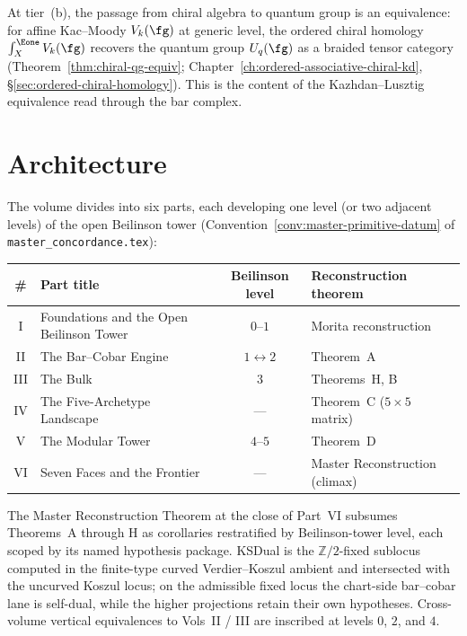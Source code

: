 At tier~(b), the passage from chiral algebra to quantum group
is an equivalence: for affine Kac--Moody $V_k(\fg)$ at generic
level, the ordered chiral homology $\int_X^{\Eone} V_k(\fg)$
recovers the quantum group $U_q(\fg)$ as a braided tensor
category (Theorem~\ref{thm:chiral-qg-equiv};
Chapter~\ref{ch:ordered-associative-chiral-kd},
\S\ref{sec:ordered-chiral-homology}).
This is the content of the Kazhdan--Lusztig equivalence read
through the bar complex.

\section{Architecture}
\label{sec:architecture}

\begin{remark}
\label{rem:manuscript-layout}
%
%
The volume divides into six parts, each developing one level (or two
adjacent levels) of the open Beilinson tower
\textup{(}Convention~\ref{conv:master-primitive-datum} of
\texttt{master\_concordance.tex}\textup{):}
\begin{center}
\renewcommand{\arraystretch}{1.2}
\begin{tabular}{@{}c l c l@{}}
\toprule
\# & Part title & Beilinson level & Reconstruction theorem \\
\midrule
I  & Foundations and the Open Beilinson Tower      & $0$--$1$         & Morita reconstruction \\
II & The Bar--Cobar Engine                          & $1\!\leftrightarrow\!2$ & Theorem~A \\
III& The Bulk                                       & $3$              & Theorems~H, B \\
IV & The Five-Archetype Landscape                   & ---              & Theorem~C ($5{\times}5$ matrix) \\
V  & The Modular Tower                              & $4$--$5$         & Theorem~D \\
VI & Seven Faces and the Frontier                   & ---              & Master Reconstruction (climax) \\
\bottomrule
\end{tabular}
\end{center}
The Master Reconstruction Theorem at the close of Part~VI subsumes
Theorems~A through H as corollaries restratified by Beilinson-tower
level, each scoped by its named hypothesis package. KSDual is the
$\mathbb Z/2$-fixed sublocus computed in the finite-type curved
Verdier--Koszul ambient and intersected with the uncurved Koszul
locus; on the admissible fixed locus the chart-side bar--cobar lane is
self-dual, while the higher projections retain their own hypotheses.
Cross-volume vertical equivalences to Vols~II / III are inscribed at
levels $0$, $2$, and $4$.
\end{remark}

